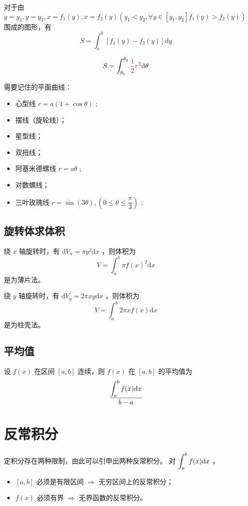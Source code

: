 对于由 $ y = y_1, y = y_2,x = f_1(y), x = f_2(y) (y_1 < y_2,\forall y \in [y_1,y_2]f_1(y) > f_2(y)) $ 
围成的图形，有 $$
    S = \int_a^b[f_1(y)-f_2(y)]\mathrm{d}y
$$ 


$$
    S = \int_{\theta_1}^{\theta_2}\textcolor{red}{\dfrac{1}{2}r^2}\mathrm{d}\theta
$$ 

需要记住的平面曲线：
\begin{itemize}
    \item 心型线 $ r = a(1+\cos\theta) $ ;
    \item 摆线（旋轮线）；
    \item 星型线；
    \item 双扭线；
    \item 阿基米德螺线 $ r = a\theta $ ;
    \item 对数螺线；
    \item 三叶玫瑰线 $ r = \sin(3\theta),(0\leq\theta\leq \dfrac{\pi}{3}) $ ;
\end{itemize}

\subsection{旋转体求体积}

绕 $ x $ 轴旋转时，有 $ \mathrm{d}V_x = \pi y^2 \mathrm{d}x $ ，则体积为$$
    V = \int_a^b \pi f(x)^2 \mathrm{d}x
$$ 
是为薄片法。

绕 $ y $ 轴旋转时，有 $ \mathrm{d}V_y = 2\pi xy \mathrm{d} x $ ，则体积为$$
    V = \int_a^b 2\pi xf(x)\mathrm{d}x
$$ 
是为柱壳法。

\subsection{平均值}

设 $ f(x) $ 在区间 $ [a,b] $ 连续，则 $ f(x) $ 在 $ [a,b] $ 的平均值为
$$
    \dfrac{\displaystyle \int_a^b f(x)\mathrm{d}x}{b-a}
$$ 

\section{反常积分}

定积分存在两种限制，由此可以引申出两种反常积分。
对 $ \displaystyle \int_a^b f(x)\mathrm{d}x $ ，
\begin{itemize}
    \item $ [a,b] $ 必须是有限区间 $ \Rightarrow $ 无穷区间上的反常积分；
    \item $ f(x) $ 必须有界 $ \Rightarrow $ 无界函数的反常积分。
\end{itemize}

